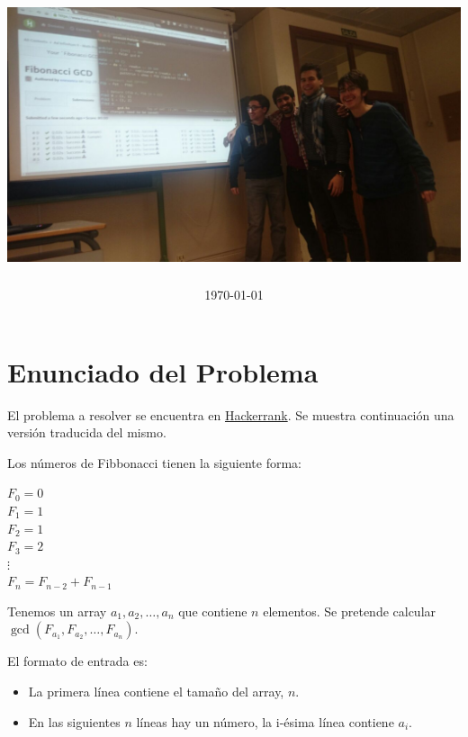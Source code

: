 \documentclass{article}
\title{                                             %
    \textmd{\textbf{\asignatura \\ \titulo}} \\         %
    \vspace{2cm}
    \includegraphics[width=15.5cm]{FibonacciGCD.jpg}    %
    \vspace{1cm}
}
\author{\textbf{\autor}}                            %
\date{\today}                                       %
\theoremstyle{theorem-style}  %
\theoremstyle{definition}
\theoremstyle{example-style}
\begin{document}
\maketitle

\makeatletter\renewcommand{\ALG@name}{Algoritmo}
\renewcommand{\listalgorithmname}{Lista de \ALG@name s} \makeatother



\newpage

\section*{Enunciado del Problema}
    El problema a resolver se encuentra en \href{https://www.hackerrank.com/contests/infinitum9/challenges/fibonacci-gcd}{Hackerrank}. Se muestra  continuación una versión traducida del mismo.
    
    Los números de Fibbonacci tienen la siguiente forma:
    
    \begin{center}
        $F_0 = 0$\\
        $F_1 = 1$\\
        $F_2 = 1$\\
        $F_3 = 2$\\
        $\vdots$\\
        $F_n = F_{n-2} + F_{n-1}$
    \end{center}
    
    Tenemos un array $a_1,a_2,\dots,a_n$ que contiene $n$ elementos. Se pretende calcular $\gcd(F_{a_1},F_{a_2},\dots,F_{a_n})$.
    
    El formato de entrada es:
    \begin{itemize}
        \item La primera línea contiene el tamaño del array, $n$.
        \item En las siguientes $n$ líneas hay un número, la i-ésima línea contiene $a_i$.
    \end{itemize} 
    
\end{document}

